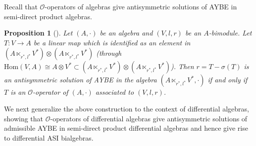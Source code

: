\documentclass[pdftex]{sigma}
\numberwithin{equation}{section}
\newtheorem{Proposition}[Theorem]{Proposition}
{ \theoremstyle{definition}
	\newtheorem{Definition}[Theorem]{Definition}
	\newtheorem{Note}[Theorem]{Note}
	\newtheorem{Example}[Theorem]{Example}
	\newtheorem{Remark}[Theorem]{Remark} }
\newcommand{\Hom}{\mathrm{Hom}}
\begin{document}
Recall that $\mathcal{O}$-operators of algebras give antisymmetric
solutions of AYBE in semi-direct product algebras.

\begin{Proposition}[{\cite[Corollary~3.10]{Bai2013O}}]\label{pro:O-cons}
 Let $(A, \cdot)$ be an algebra and $(V, l, r)$ be an $A$-bimodule.
 Let $T\colon V \to A$ be a linear map which is identified as an element in $(A \ltimes_{r^*, l^*} V^*) \otimes(A \ltimes_{r^*, l^*} V^*)$
 (through $\Hom(V, A) \cong A \otimes V^* \subset (A \ltimes_{r^*, l^*} V^*) \otimes (A \ltimes_{r^*, l^*} V^*)$).
 Then $r = T - \sigma(T)$ is an antisymmetric solution of AYBE in the algebra $(A \ltimes_{r^*, l^*}V^*, \cdot)$ if and only if $T$ is an $\mathcal{O}$-operator of $(A, \cdot)$ associated to $(V, l, r)$.
\end{Proposition}

We next generalize the above construction to the context of differential algebras,
showing that $\mathcal{O}$-operators of differential algebras give antisymmetric solutions of admissible AYBE in semi-direct product differential algebras and hence give rise to differential ASI bialgebras.
\end{document}
